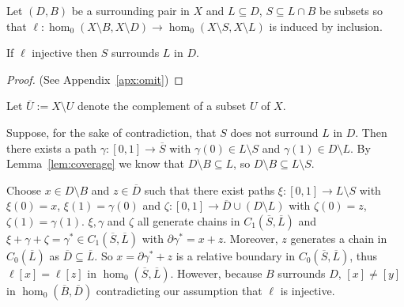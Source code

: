\begin{lemma}\label{lem:cov_surrounds}
  Let $(D, B)$ be a surrounding pair in $X$ and $L\subseteq D$, $S\subseteq L\cap B$ be subsets so that $\ell: \hom_0(X\setminus B, X\setminus D)\to \hom_0(X\setminus S, X\setminus L)$ is induced by inclusion.

  If $\ell$ injective then $S$ surrounds $L$ in $D$.
\end{lemma}
\begin{proof}
  (See Appendix~\ref{apx:omit})
\end{proof}
\proofatend
  Let $\overline{U} := X\setminus U$ denote the complement of a subset $U$ of $X$.

  Suppose, for the sake of contradiction, that $S$ does not surround $L$ in $D$.
  Then there exists a path $\gamma : [0,1]\to\overline{S}$ with $\gamma(0)\in L\setminus S$ and $\gamma(1)\in D\setminus L$.
  By Lemma~\ref{lem:coverage} we know that $D\setminus B\subseteq L$, so $D\setminus B\subseteq L\setminus S$.

  Choose $x\in D\setminus B$ and $z\in \overline{D}$ such that there exist paths $\xi : [0,1]\to L\setminus S$ with $\xi(0) = x$, $\xi(1) = \gamma(0)$ and $\zeta : [0,1]\to \overline{D}\cup (D\setminus L)$ with $\zeta(0) = z$, $\zeta(1) = \gamma(1)$.
  $\xi, \gamma$ and $\zeta$ all generate chains in $C_1(\overline{S}, \overline{L})$ and $\xi + \gamma + \zeta = \gamma^*\in C_1(\overline{S}, \overline{L})$ with $\partial\gamma^* = x + z$.
  Moreover, $z$ generates a chain in $C_0(\overline{L})$ as $\overline{D}\subseteq\overline{L}$.
  So $x = \partial\gamma^* + z$ is a relative boundary in $C_0(\overline{S}, \overline{L})$, thus $\ell[x] = \ell[z]$ in $\hom_0(\overline{S}, \overline{L})$.
  However, because $B$ surrounds $D$, $[x]\neq [y]$ in $\hom_0(\overline{B}, \overline{D})$ contradicting our assumption that $\ell$ is injective.
\endproofatend

